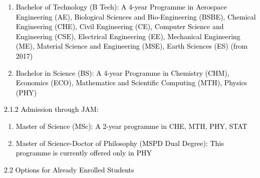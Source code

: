 \documentclass[12pt]{article}
\begin{document}
\vspace{\baselineskip}
\begin{enumerate}
	\item {\fontsize{10pt}{12.0pt}\selectfont \textcolor[HTML]{00000A}{Bachelor of Technology (B Tech): A 4-year Programme in Aerospace Engineering (AE), Biological Sciences and Bio-Engineering (BSBE), Chemical Engineering (CHE), Civil Engineering (CE), Computer Science and Engineering (CSE), Electrical Engineering (EE), Mechanical Engineering (ME), Material Science and Engineering (MSE), Earth Sciences (ES) (from 2017)}\par}\par


\vspace{\baselineskip}
	\item {\fontsize{10pt}{12.0pt}\selectfont \textcolor[HTML]{00000A}{Bachelor in Science (BS): A 4-year Programme in Chemistry (CHM), Economics (ECO), Mathematics and Scientific Computing (MTH), Physics (PHY)}\par}
\end{enumerate}\par


\vspace{\baselineskip}
{\fontsize{10pt}{12.0pt}\selectfont \textcolor[HTML]{00000A}{2.1.2 Admission through JAM:}\par}\par


\vspace{\baselineskip}
\begin{enumerate}
	\item {\fontsize{10pt}{12.0pt}\selectfont \textcolor[HTML]{00000A}{Master of Science (MSc): A 2-year programme in CHE, MTH, PHY, STAT}\par}\par


\vspace{\baselineskip}
	\item {\fontsize{10pt}{12.0pt}\selectfont \textcolor[HTML]{00000A}{Master of Science-Doctor of Philosophy (MSPD Dual Degree): This programme is currently offered only in PHY}\par}
\end{enumerate}\par


\vspace{\baselineskip}
\textcolor[HTML]{00000A}{2.2 Options for Already Enrolled Students}\par
\end{document}
